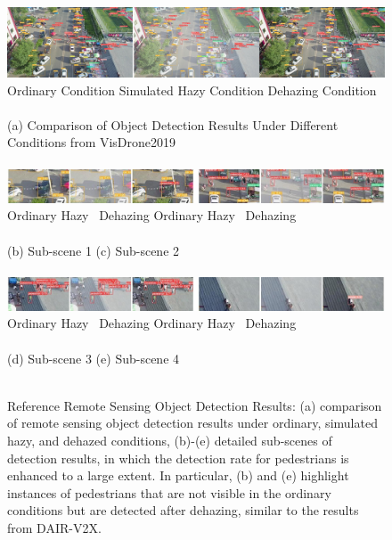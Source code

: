 \documentclass[lettersize,journal]{IEEEtran}
\begin{document}
\begin{figure}[pht]
    \centering    
    \includegraphics[width=\textwidth]{rm_pic2.jpg}
    Ordinary Condition \qquad\qquad\qquad\qquad Simulated Hazy Condition \qquad\qquad\qquad\quad Dehazing Condition\\

    \quad \\
    
    (a) Comparison of Object Detection Results Under Different Conditions from VisDrone2019\\

    \quad \\
    
    \includegraphics[width=\textwidth]{rm_pic3.jpg}
    Ordinary \qquad\qquad\quad Hazy \qquad\qquad\quad\ Dehazing 
    \qquad \qquad \quad
    Ordinary \qquad\qquad\quad Hazy \qquad\qquad\quad\ Dehazing\\

    \quad \\
    
    (b) Sub-scene 1\qquad\qquad\qquad\qquad\qquad\qquad\qquad\qquad\qquad\quad\; (c) Sub-scene 2\\

    \quad \\

    \includegraphics[width=\textwidth]{rm_pic4.jpg}
    Ordinary \qquad\qquad\quad Hazy \qquad\qquad\quad\ Dehazing 
    \qquad \qquad \quad
    Ordinary \qquad\qquad\quad Hazy \qquad\qquad\quad\ Dehazing\\
    
    \quad \\
    
    (d) Sub-scene 3\qquad\qquad\qquad\qquad\qquad\qquad\qquad\qquad\qquad\quad\; (e) Sub-scene 4\\

    \quad \\
    
    \caption{Reference Remote Sensing Object Detection Results: (a) comparison of remote sensing object detection results under ordinary, simulated hazy, and dehazed conditions, (b)-(e) detailed sub-scenes of detection results, in which the detection rate for pedestrians is enhanced to a large extent. In particular, (b) and (e) highlight instances of pedestrians that are not visible in the ordinary conditions but are detected after dehazing, similar to the results from DAIR-V2X.}
    
    \label{remote_object_detection}
    
\end{figure}
\end{document}
